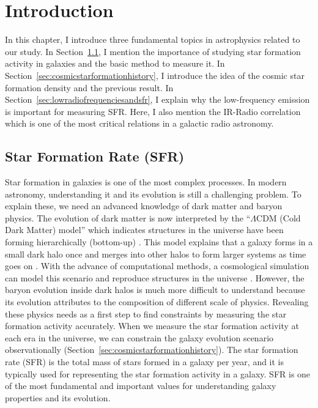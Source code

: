 \chapter{Introduction}\label{chap:introduction}
\begin{chapabstract}

In this chapter, I introduce three fundamental topics in astrophysics related to our study.
In Section~\ref{sec:starformationrate}, I mention the importance of studying star formation activity in galaxies and the basic method to measure it.
In Section~\ref{sec:cosmicstarformationhistory}, I introduce the idea of the cosmic star formation density and the previous result.
In Section~\ref{sec:lowradiofrequenciesandsfr}, I explain why the low-frequency emission is important for measuring SFR\@.
Here, I also mention the IR-Radio correlation which is one of the most critical relations in a galactic radio astronomy.


\end{chapabstract}

\section{Star Formation Rate (SFR)}\label{sec:starformationrate}

Star formation in galaxies is one of the most complex processes.
In modern astronomy, understanding it and its evolution is still a challenging problem.
To explain these, we need an advanced knowledge of dark matter and baryon physics.
The evolution of dark matter is now interpreted by the ``$\Lambda$CDM (Cold Dark Matter) model'' which indicates structures in the universe have been forming hierarchically (bottom-up) \citep[e.g.,][]{Peebles1982}.
This model explains that a galaxy forms in a small dark halo once and merges into other halos to form larger systems as time goes on \citep{Blumenthal1984}.
With the advance of computational methods, a cosmological simulation can model this scenario and reproduce structures in the universe \citep[e.g.,][]{Navarro2000, Vale2004}.
However, the baryon evolution inside dark halos is much more difficult to understand because its evolution attributes to the composition of different scale of physics.
Revealing these physics needs as a first step to find constraints by measuring the star formation activity accurately.
When we measure the star formation activity at each era in the universe, we can constrain the galaxy evolution scenario observationally (Section~\ref{sec:cosmicstarformationhistory}).
The star formation rate (SFR) is the total mass of stars formed in a galaxy per year, and it is typically used for representing the star formation activity in a galaxy.
SFR is one of the most fundamental and important values for understanding galaxy properties and its evolution.

